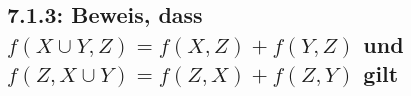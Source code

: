 \subsection*{7.1.3: Beweis, dass $f(X\cup Y,Z)=f(X,Z)+f(Y,Z)$ und $f(Z,X\cup Y)=f(Z,X)+f(Z,Y)$ gilt}